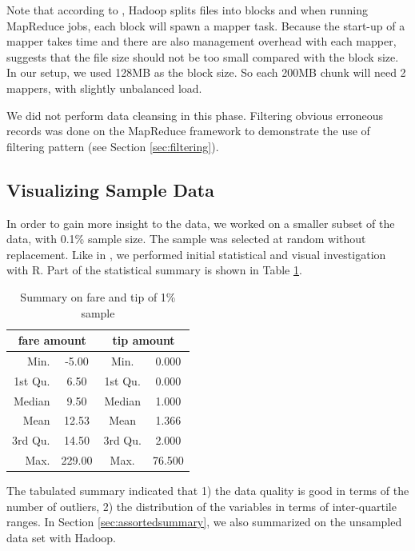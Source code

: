 \documentclass[12pt,a4paper]{article}
\begin{document}
Note that according to \cite{hdbestpract}, Hadoop splits files into blocks and when running MapReduce jobs, each block will spawn a mapper task. Because the start-up of a mapper takes time and there are also management overhead with each mapper, \cite{hdbestpract} suggests that the file size should not be too small compared with the block size. In our setup, we used 128MB as the block size. So each 200MB chunk will need 2 mappers, with slightly unbalanced load.

We did not perform data cleansing in this phase. Filtering obvious erroneous records was done on the MapReduce framework to demonstrate the use of filtering pattern (see Section \ref{sec:filtering}).

\subsection{Visualizing Sample Data}
\label{sec:initialexpl}
In order to gain more insight to the data, we worked on a smaller subset of the data, with 0.1\% sample size. The sample was selected at random without replacement. Like in \cite{hafenwebsite}, we performed initial statistical and visual investigation with R. Part of the statistical summary is shown in Table \ref{tab:rsummary}.

\begin{table}[h]
  \centering
  \caption{Summary on fare and tip of 1\% sample}
    \label{tab:rsummary}
    \begin{tabular}{|r|c|c|c|} \hline
      \multicolumn{2}{|c|}{fare amount}   & \multicolumn{2}{|c|}{tip amount} \\ \hline
      Min.   & -5.00  &  Min.   & 0.000   \\ \hline
      1st Qu.&  6.50  &  1st Qu.& 0.000   \\ \hline
      Median &  9.50  &  Median & 1.000   \\ \hline
      Mean   & 12.53  &  Mean   & 1.366   \\ \hline
      3rd Qu.& 14.50  &  3rd Qu.& 2.000   \\ \hline
      Max.   &229.00  &  Max.   &76.500 \\ \hline
    \end{tabular}
  \end{table}

  The tabulated summary indicated that 1) the data quality is good in terms of the number of  outliers, 2) the distribution of the variables in terms of inter-quartile ranges. In Section \ref{sec:assortedsummary}, we also summarized on the unsampled data set with Hadoop.
\end{document}
